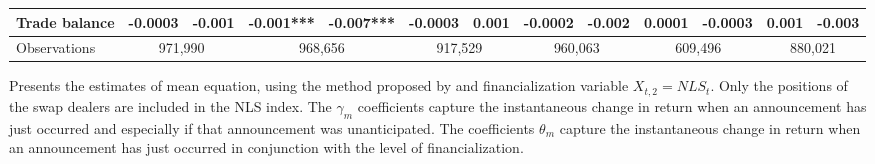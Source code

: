 \begin{landscape}
\begin{table}[]
{\begin{tabular}{lllllllllllll}
Trade balance            & -0.0003   & -0.001   & -0.001***  & -0.007*** & -0.0003   & 0.001     & -0.0002    & -0.002    & 0.0001    & -0.0003   & 0.001     & -0.003    \\ \hline
Observations &
  \multicolumn{2}{c}{971,990} &
  \multicolumn{2}{c}{968,656} &
  \multicolumn{2}{c}{917,529} &
  \multicolumn{2}{c}{960,063} &
  \multicolumn{2}{c}{609,496} &
  \multicolumn{2}{c}{880,021} \\ \hline
\end{tabular}%
}
 \singlespacing
        \footnotesize
      Presents the estimates of mean equation, using the method proposed by \citep{andersen2007real} and financialization variable $X_{t,2}=NLS_t$. Only the positions of the swap dealers are included in the NLS index. The $\gamma_m$ coefficients capture the instantaneous change in return when an announcement has just occurred and especially if that announcement was unanticipated. The coefficients $\theta_m$ capture the instantaneous change in return when an announcement has just occurred in conjunction with the level of financialization.
\end{table}
\end{landscape}

